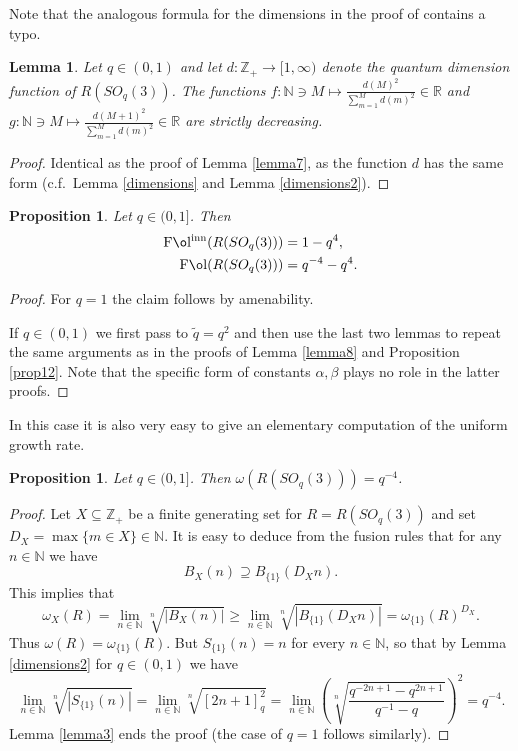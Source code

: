 \documentclass[11 pt, leqno]{amsart}
\newcommand{\NN}{\mathbb{N}}
\newcommand{\ZZ}{\mathbb{Z}}
\DeclareMathOperator{\Fol}{F\mathrm{\o}l}
\DeclareMathOperator{\Folinn}{F\mathrm{\o}l^{inn}}
\newtheorem{proposition}[theorem]{Proposition}
\newtheorem{lemma}[theorem]{Lemma}
\theoremstyle{definition}
\numberwithin{equation}{section}
\begin{document}
Note that  the analogous formula for the dimensions in the proof of \cite[Theorem 4.1(3)]{BanicaVergnioux} contains a typo.

\begin{lemma}
	Let $q \in (0,1)$ and let $d\colon \ZZ_+\to [1,\infty)$ denote the quantum dimension function of $R(SO_q(3))$. The functions  $f\colon\NN \ni M \mapsto \frac{d(M)^2}{\sum_{m=1}^M d(m)^2} \in \mathbb{R}$  and $g\colon\NN \ni M \mapsto \frac{d(M+1)^2}{\sum_{m=1}^M d(m)^2} \in \mathbb{R}$ are strictly decreasing.	
\end{lemma}
\begin{proof}
	Identical as the proof of Lemma \ref{lemma7}, as the function $d$ has the same form (c.f.\ Lemma \ref{dimensions} and Lemma \ref{dimensions2}).
\end{proof}







\begin{proposition}
 Let $q\in (0,1]$. Then 
\[\begin{split}
 \Folinn(R(SO_q(3)))&=1-q^{4},\\
\Fol(R(SO_q(3)))&=q^{-4} - q^{4}.
\end{split}\]
\end{proposition}
\begin{proof}
For $q=1$ the claim follows by amenability.	
	
If $q \in (0,1)$ we first pass to $\tilde{q} = q^2$ and then use the last two lemmas to repeat the same arguments  as in the proofs of Lemma \ref{lemma8} and Proposition \ref{prop12}. Note that the specific form of constants $\alpha, \beta$ plays no role in the latter proofs.
\end{proof}


In this case it is also very easy to give an elementary computation  of the uniform growth rate.


\begin{proposition}\label{prop15}
Let $q\in (0,1]$. Then  $\omega(R(SO_q(3)))=q^{-4}$.	
\end{proposition}
\begin{proof}
Let $X \subseteq \ZZ_+$ be a finite generating set for $R=R(SO_q(3))$ and set $D_X = \max\{m \in X\} \in \NN$. 
It is easy to deduce from the fusion rules that for any $n \in \NN$ we have
\[B_X(n)\supseteq B_{\{1\}}(D_X n).\]
This implies that 
\[ \omega_X(R) = \lim_{n \in \NN} \sqrt[n]{|B_X(n)|} \geq \lim_{n \in \NN} \sqrt[n]{|B_{\{1\}}(D_X n)|} = 
\omega_{\{1\}}(R)^{D_X}.\]	
Thus $\omega(R) = \omega_{\{1\}}(R)$. But $S_{\{1\}}(n) = n$ for every $n \in \NN$, so that by Lemma \ref{dimensions2}  for $q\in (0,1)$ we have
\[ \lim_{n \in\NN} \sqrt[n]{|S_{\{1\}}(n)|}= \lim_{n \in\NN} \sqrt[n]{[2n+1]_q^2}
= \lim_{n \in\NN} \left(\sqrt[n]{\frac{q^{-2n+1} - q^{2n+1}}{q^{-1}- q}}\right)^2 = q^{-4}. \]	
Lemma \ref{lemma3} ends the proof (the case of $q=1$ follows similarly).	

\end{proof}
\end{document}
